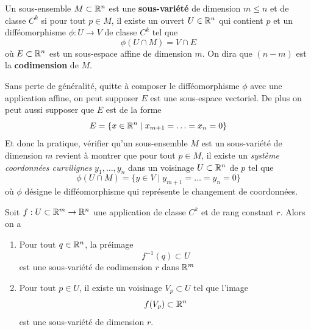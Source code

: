 \begin{definition} \label{def: Sous-variété}
	Un sous-ensemble $M \subset \mathbb{R}^n$ est une \textbf{sous-variété} de dimension $m \leqslant n$ et de classe $C^k$ si pour tout $p \in M$, il existe un ouvert $U \in \mathbb{R}^n$ qui contient $p$ et un difféomorphisme $\phi: U \to V$ de classe $C^k$ tel que
	\[
	\phi(U \cap M) = V \cap E
	\]
	où $E \subset \mathbb{R}^n$ est un sous-espace affine de dimension $m$. On dira que $(n-m)$ est la \textbf{codimension} de $M$.
\end{definition}

\begin{remarque}
	Sans perte de généralité, quitte à composer le difféomorphisme $\phi$ avec une application affine, on peut supposer $E$ est une sous-espace vectoriel. De plus on peut aussi supposer que $E$ est de la forme
	\[
	E = \{ x \in \mathbb{R}^n \mid x_{m+1} = \ldots = x_n = 0\}
	\]
	Et donc la pratique, vérifier qu'un sous-ensemble $M$ est un sous-variété de dimension $m$ revient à montrer que pour tout $p \in M$, il existe un \emph{système coordonnées curvilignes} $y_1, \ldots, y_n$ dans un voisinage $U \subset \mathbb{R}^n$ de $p$ tel que
	\[
	\phi(U \cap M) = \{y \in V \mid y_{m+1} = \ldots = y_n = 0\}
	\]
	où $\phi$ désigne le difféomorphisme qui représente le changement de coordonnées.
\end{remarque}

\begin{theoreme}
	Soit $f : U  \subset \mathbb{R}^m \to \mathbb{R}^n$ une application de classe $C^k$ et de rang constant $r$. Alors on a
	\begin{enumerate}
		\item Pour tout $q \in \mathbb{R}^n$, la préimage
		\[
		f^{-1} (q) \subset U
		\]
		est une sous-variété de codimension $r$ dans $\mathbb{R}^m$
		
		\item Pour tout $p \in U$, il existe un voisinage $V_p \subset U$ tel que l'image
		\[
		f(V_p) \subset \mathbb{R}^n
		\]
		est une sous-variété de dimension $r$.
	\end{enumerate}
\end{theoreme}